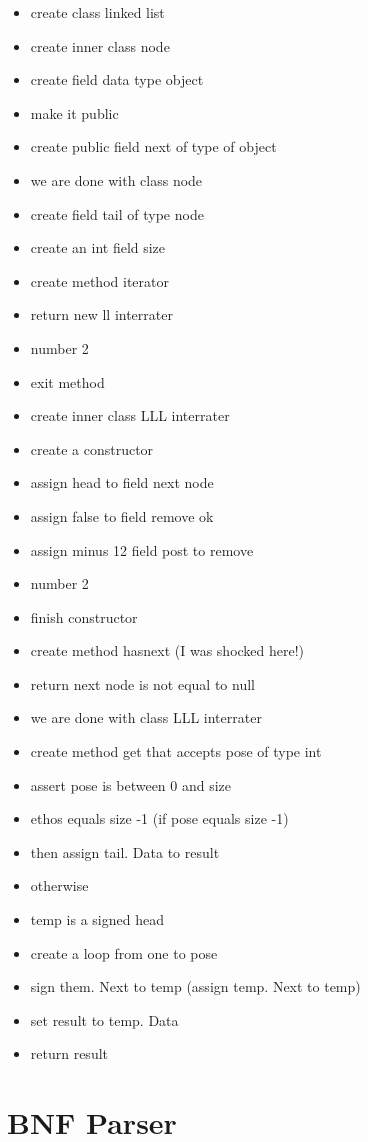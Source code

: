 \begin{itemize}
	\item create class linked list
	\item create inner class node
	\item create field data type object
	\item make it public
	\item create public field next of type of object
	\item we are done with class node
	\item create field tail of type node
	\item create an int field size
	\item create method iterator
	\item return new ll interrater
	\item number 2
	\item exit method
	\item create inner class LLL interrater
	\item create a constructor
	\item assign head to field next node
	\item assign false to field remove ok
	\item assign minus 12 field post to remove
	\item number 2
	\item finish constructor
	\item create method hasnext (I was shocked here!)
	\item return next node is not equal to null
	\item we are done with class LLL interrater
	\item create method get that accepts pose of type int
	\item assert pose is between 0 and size
	\item ethos equals size -1 (if pose equals size -1)
	\item then assign tail. Data to result
	\item otherwise
	\item temp is a signed head
	\item create a loop from one to pose
	\item sign them. Next to temp (assign temp. Next to temp)
	\item set result to temp. Data
	\item return result
\end{itemize}
 
\section{BNF Parser} \label{section:BNF Parser}
